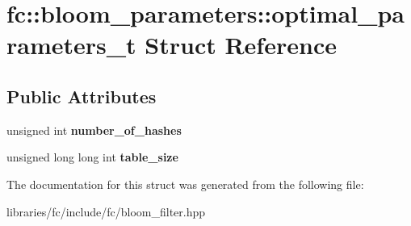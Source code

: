 \hypertarget{structfc_1_1bloom__parameters_1_1optimal__parameters__t}{}\section{fc\+:\+:bloom\+\_\+parameters\+:\+:optimal\+\_\+parameters\+\_\+t Struct Reference}
\label{structfc_1_1bloom__parameters_1_1optimal__parameters__t}
\subsection*{Public Attributes}
\begin{DoxyCompactItemize}
\item 
\mbox{\label{structfc_1_1bloom__parameters_1_1optimal__parameters__t_ac688801825a52e79db45876a07287b0c}} 
unsigned int {\bfseries number\+\_\+of\+\_\+hashes}
\item 
\mbox{\label{structfc_1_1bloom__parameters_1_1optimal__parameters__t_abb12692c671d7484c15116bb57bd37e0}} 
unsigned long long int {\bfseries table\+\_\+size}
\end{DoxyCompactItemize}


The documentation for this struct was generated from the following file\+:\begin{DoxyCompactItemize}
\item 
libraries/fc/include/fc/bloom\+\_\+filter.\+hpp\end{DoxyCompactItemize}
